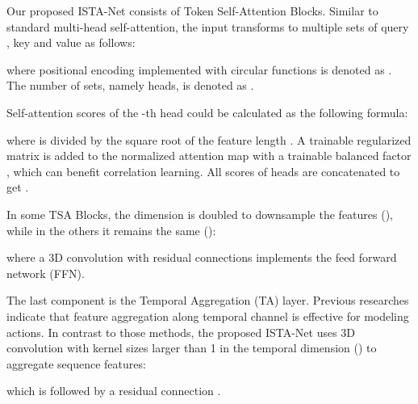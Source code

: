 \documentclass[letterpaper, 10 pt, conference]{ieeeconf}
\begin{document}
Our proposed ISTA-Net consists of  Token Self-Attention Blocks. Similar to standard multi-head self-attention, the input  transforms to multiple sets of query , key  and value  as follows:  



where positional encoding implemented with circular functions is denoted as . The number of sets, namely heads, is denoted as .

Self-attention scores  of the -th head could be calculated as the following formula:

where  is divided by the square root of the feature length . A trainable regularized matrix  is added to the normalized attention map with a trainable balanced factor , which can benefit correlation learning\cite{dstanet2020,STSA-Net2023}. All scores  of  heads are concatenated to get . 

In some TSA Blocks, the  dimension is doubled to downsample the features (), while in the others it remains the same ():


where a 3D  convolution with residual connections implements the feed forward network (FFN).

The last component is the Temporal Aggregation (TA) layer. Previous researches\cite{tcagcn2022,hdgcn2022} indicate that feature aggregation along temporal channel is effective for modeling actions. In contrast to those methods, the proposed ISTA-Net uses 3D convolution with kernel sizes larger than 1 in the temporal dimension () to aggregate sequence features:

which is followed by a residual connection .
\end{document}

